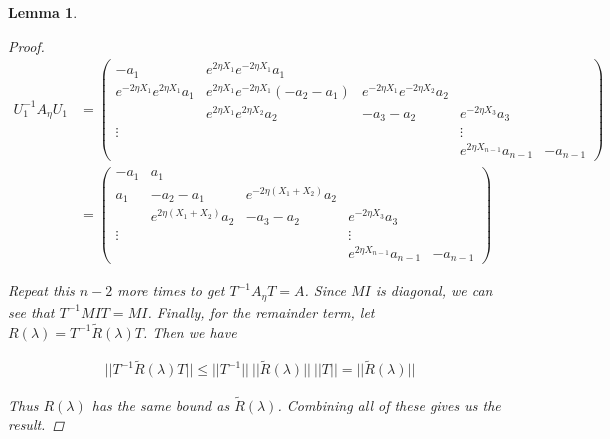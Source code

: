 \documentclass[12pt]{article}
\newtheorem{lemma}{Lemma}
\begin{document}
\begin{lemma}
\begin{proof}
\begin{align*}
U_1^{-1} A_\eta U_1 &= \begin{pmatrix}
-a_1 & e^{2 \eta X_1} e^{-2 \eta X_1} a_1 \\
e^{-2 \eta X_1} e^{2 \eta X_1} a_1 & e^{2 \eta X_1} e^{-2 \eta X_1}(-a_2 - a_1) & e^{-2 \eta X_1}e^{-2 \eta X_2} a_2 \\
& e^{2 \eta X_1} e^{2 \eta X_2} a_2 & -a_3 - a_2 & e^{-2 \eta X_3} a_3 \\
\vdots & & & \vdots \\
& & & e^{2 \eta X_{n-1}} a_{n-1} & -a_{n-1} 
\end{pmatrix}\\
&= \begin{pmatrix}
-a_1 & a_1 \\
a_1 & -a_2 - a_1 & e^{-2 \eta (X_1+X_2)} a_2 \\
& e^{2 \eta (X_1+X_2)} a_2 & -a_3 - a_2 & e^{-2 \eta X_3} a_3 \\
\vdots & & & \vdots \\
& & & e^{2 \eta X_{n-1}} a_{n-1} & -a_{n-1} 
\end{pmatrix}
\end{align*}

Repeat this $n-2$ more times to get $T^{-1} A_\eta T = A$. Since $M I$ is diagonal, we can see that $T^{-1} MI T = MI$. Finally, for the remainder term, let $R(\lambda) = T^{-1} \tilde{R}(\lambda)T$. Then we have 

\begin{align*}
||T^{-1} \tilde{R}(\lambda)T|| \leq ||T^{-1} ||\:|| \tilde{R}(\lambda)||\:||T|| = || \tilde{R}(\lambda)||
\end{align*}

Thus $R(\lambda)$ has the same bound as $\tilde{R}(\lambda)$. Combining all of these gives us the result.

\end{proof}
\end{lemma}



\end{document}
